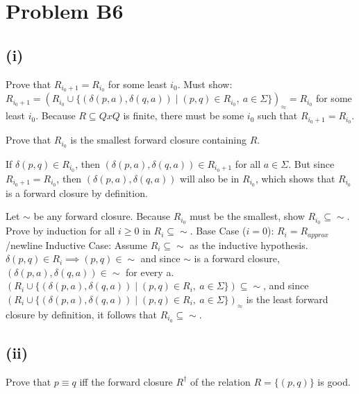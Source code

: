 \documentclass[12pt]{article}
\begin{document}
\section*{Problem B6}

\subsection*{(i)}
Prove that $R_{i_{0}+1} = R_{i_{0}}$ for some least $i_0$.\newline
Must show: $R_{i_{0} + 1} = (R_{i_{0}} \cup 
\{(\delta(p, a), \delta(q, a)) \mid (p, q)\in R_{i_{0}},\ a\in \Sigma\})_{\approx} 
= R_{i_{0}}$ for some least $i_0$.\newline
Because $R \subseteq QxQ$ is finite, there must be some $i_0$ such that 
$R_{i_0+1} = R_{i_0}$.

\medskip

Prove that $R_{i_{0}}$ is the smallest forward closure
containing $R$.

\medskip

If $\delta(p, q) \in R_{i_{0}}$, then $(\delta(p, a), \delta(q, a)) \in 
R_{i_{0}+1}$ for all $a \in \Sigma$. But since $R_{i_{0}+1}=R_{i_{0}}$, then 
$(\delta(p, a), \delta(q, a))$ will also be in $R_{i_{0}}$, which shows that
$R_{i_{0}}$ is a forward closure by definition.

\medskip

Let $\sim$ be any forward closure. Because $R_{i_{0}}$ must be the smallest, 
show $R_{i_{0}} \subseteq \sim$. \newline
Prove by induction for all $i \ge 0$ in $R_i \subseteq \sim$. \newline
Base Case ($i=0$): $R_i = R_{approx}$ /newline
Inductive Case: Assume $R_i \subseteq \sim$ as the inductive hypothesis.
$\delta(p, q) \in R_i \implies (p,q) \in \sim$ and since $\sim$ is a forward
closure, $(\delta(p, a),\delta(q, a)) \in \sim$ for every a. 
$(R_{i} \cup 
\{(\delta(p, a), \delta(q, a)) \mid (p, q)\in R_{i},\ a\in \Sigma\}) \subseteq
\sim$, and since $(R_{i} \cup                    
\{(\delta(p, a), \delta(q, a)) \mid (p, q)\in R_{i},\ a\in \Sigma\})_{\approx}$
is the least forward closure by definition, it follows that $R_{i_{0}} \subseteq \sim$.

\subsection*{(ii)}
Prove that $p\equiv q$ iff the forward closure $R^{\dagger}$ of the
relation $R = \{(p, q)\}$ is good.
\end{document}
